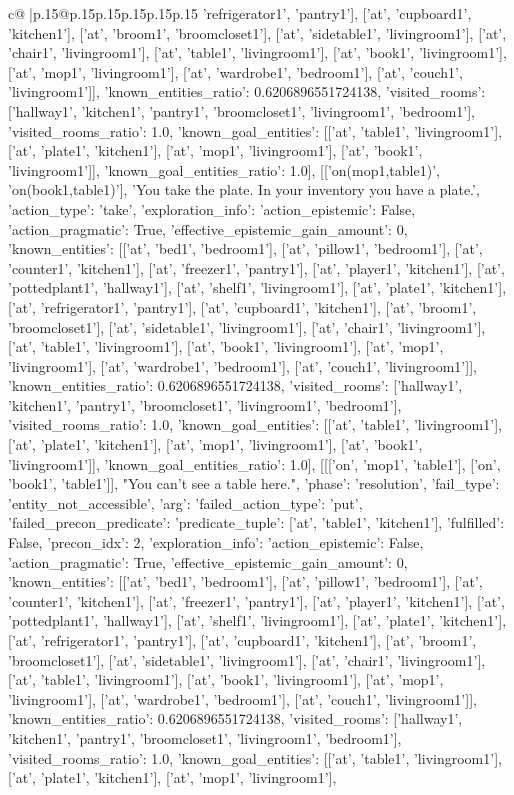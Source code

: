 \documentclass{article}
\begin{document}
{\begin{supertabular}{c@{$\;$}|p{.15\linewidth}@{}p{.15\linewidth}p{.15\linewidth}p{.15\linewidth}p{.15\linewidth}p{.15\linewidth}}
{{{'refrigerator1', 'pantry1'], ['at', 'cupboard1', 'kitchen1'], ['at', 'broom1', 'broomcloset1'], ['at', 'sidetable1', 'livingroom1'], ['at', 'chair1', 'livingroom1'], ['at', 'table1', 'livingroom1'], ['at', 'book1', 'livingroom1'], ['at', 'mop1', 'livingroom1'], ['at', 'wardrobe1', 'bedroom1'], ['at', 'couch1', 'livingroom1']], 'known_entities_ratio': 0.6206896551724138, 'visited_rooms': ['hallway1', 'kitchen1', 'pantry1', 'broomcloset1', 'livingroom1', 'bedroom1'], 'visited_rooms_ratio': 1.0, 'known_goal_entities': [['at', 'table1', 'livingroom1'], ['at', 'plate1', 'kitchen1'], ['at', 'mop1', 'livingroom1'], ['at', 'book1', 'livingroom1']], 'known_goal_entities_ratio': 1.0}}], [['on(mop1,table1)', 'on(book1,table1)'], 'You take the plate. In your inventory you have a plate.', {'action_type': 'take', 'exploration_info': {'action_epistemic': False, 'action_pragmatic': True, 'effective_epistemic_gain_amount': 0, 'known_entities': [['at', 'bed1', 'bedroom1'], ['at', 'pillow1', 'bedroom1'], ['at', 'counter1', 'kitchen1'], ['at', 'freezer1', 'pantry1'], ['at', 'player1', 'kitchen1'], ['at', 'pottedplant1', 'hallway1'], ['at', 'shelf1', 'livingroom1'], ['at', 'plate1', 'kitchen1'], ['at', 'refrigerator1', 'pantry1'], ['at', 'cupboard1', 'kitchen1'], ['at', 'broom1', 'broomcloset1'], ['at', 'sidetable1', 'livingroom1'], ['at', 'chair1', 'livingroom1'], ['at', 'table1', 'livingroom1'], ['at', 'book1', 'livingroom1'], ['at', 'mop1', 'livingroom1'], ['at', 'wardrobe1', 'bedroom1'], ['at', 'couch1', 'livingroom1']], 'known_entities_ratio': 0.6206896551724138, 'visited_rooms': ['hallway1', 'kitchen1', 'pantry1', 'broomcloset1', 'livingroom1', 'bedroom1'], 'visited_rooms_ratio': 1.0, 'known_goal_entities': [['at', 'table1', 'livingroom1'], ['at', 'plate1', 'kitchen1'], ['at', 'mop1', 'livingroom1'], ['at', 'book1', 'livingroom1']], 'known_goal_entities_ratio': 1.0}}], [[['on', 'mop1', 'table1'], ['on', 'book1', 'table1']], "You can't see a table here.", {'phase': 'resolution', 'fail_type': 'entity_not_accessible', 'arg': {'failed_action_type': 'put', 'failed_precon_predicate': {'predicate_tuple': ['at', 'table1', 'kitchen1'], 'fulfilled': False, 'precon_idx': 2}}, 'exploration_info': {'action_epistemic': False, 'action_pragmatic': True, 'effective_epistemic_gain_amount': 0, 'known_entities': [['at', 'bed1', 'bedroom1'], ['at', 'pillow1', 'bedroom1'], ['at', 'counter1', 'kitchen1'], ['at', 'freezer1', 'pantry1'], ['at', 'player1', 'kitchen1'], ['at', 'pottedplant1', 'hallway1'], ['at', 'shelf1', 'livingroom1'], ['at', 'plate1', 'kitchen1'], ['at', 'refrigerator1', 'pantry1'], ['at', 'cupboard1', 'kitchen1'], ['at', 'broom1', 'broomcloset1'], ['at', 'sidetable1', 'livingroom1'], ['at', 'chair1', 'livingroom1'], ['at', 'table1', 'livingroom1'], ['at', 'book1', 'livingroom1'], ['at', 'mop1', 'livingroom1'], ['at', 'wardrobe1', 'bedroom1'], ['at', 'couch1', 'livingroom1']], 'known_entities_ratio': 0.6206896551724138, 'visited_rooms': ['hallway1', 'kitchen1', 'pantry1', 'broomcloset1', 'livingroom1', 'bedroom1'], 'visited_rooms_ratio': 1.0, 'known_goal_entities': [['at', 'table1', 'livingroom1'], ['at', 'plate1', 'kitchen1'], ['at', 'mop1', 'livingroom1'], }}}
\end{supertabular}}
\end{document}
